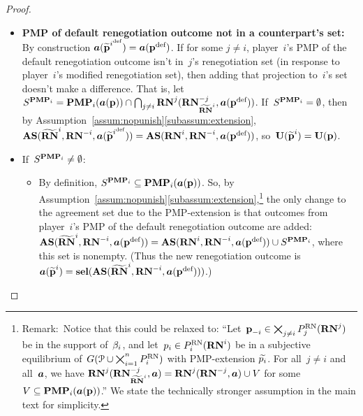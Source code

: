 \documentclass[sigconf]{aamas}
\newcommand{\selection}{sel}%
\newcommand{\renegb}{\mathbf{\selection}}
\theoremstyle{definition}
\begin{document}
\begin{proof}
\begin{itemize}
        \item \textbf{PMP of default renegotiation outcome
        not in a counterpart's set:}
         By construction
    $\boldsymbol{a}({\widetilde{\textbf{p}}^{i^{\textnormal{def}}}}) = \boldsymbol{a}({\textbf{p}}^{\textnormal{def}})$.
        If for some $j \neq i$, player~$i$'s PMP
    of the
    default
    renegotiation outcome
    isn't in~$j$'s
    renegotiation set
    (in response to
    player~$i$'s modified renegotiation set),
    then 
    adding that projection
    to~$i$'s
    set doesn't make a difference.
    That is,
    let
    ${S}^{\mathbf{PMP}_i} = \mathbf{PMP}_i(\boldsymbol{a}(\textbf{p})) \cap \bigcap_{j \neq i} \mathbf{RN}^{j}(\mathbf{RN}^{-j}_{{\widetilde{\mathbf{RN}}}^{i}}, \boldsymbol{a}({\textbf{p}}^{\textnormal{def}}))$.
    If~${S}^{\mathbf{PMP}_i} = \emptyset$,
    then by Assumption~\ref{assum:nopunish}\ref{subassum:extension}, $\textbf{AS}({\widetilde{\mathbf{RN}}}^{i}, \mathbf{RN}^{-i}, \boldsymbol{a}({\widetilde{\textbf{p}}^{i^{\textnormal{def}}}})) = \textbf{AS}(\mathbf{RN}^{i}, \mathbf{RN}^{-i}, \boldsymbol{a}({\textbf{p}}^{\textnormal{def}}))$,
    so~$\textbf{U}({\widetilde{\textbf{p}}^i}) = \textbf{U}(\textbf{p})$.
        \item 
        If~${S}^{\mathbf{PMP}_i} \neq \emptyset$:
            \begin{itemize}
            \item
            By definition, ${S}^{\mathbf{PMP}_i} \subseteq \mathbf{PMP}_i(\boldsymbol{a}(\textbf{p}))$.
            So, by Assumption~\ref{assum:nopunish}\ref{subassum:extension},\footnote{Remark:\ Notice that this could be relaxed to: ``Let~$\textbf{p}_{-i} \in \bigtimes_{j \neq i} P_j^{\textnormal{RN}}(\mathbf{RN}^{j})$ be in the
     support of~$\beta_i$,
     and let~$p_i \in P_i^{\textnormal{RN}}(\mathbf{RN}^{i})$
     be in a subjective equilibrium
     of~$G(\mathcal{P} \cup \bigtimes_{i=1}^{{n}} P_i^{\textnormal{RN}})$
     with PMP-extension $\widetilde{p_i}$.
         For all~$j \neq i$ and all~$\boldsymbol{a}$, we have
     $\mathbf{RN}^{j}(\mathbf{RN}^{-j}_{{\widetilde{\mathbf{RN}}}^{i}},\boldsymbol{a}) = \mathbf{RN}^{j}(\mathbf{RN}^{-j},\boldsymbol{a}) \cup 
     {V}$ for some ${V} \subseteq \mathbf{PMP}_i(\boldsymbol{a}(\textbf{p}))$.'' We state the technically stronger assumption in the main text for simplicity.}
            the only change to the agreement
            set due to the PMP-extension
            is that outcomes from
            player~$i$'s PMP of the default
            renegotiation outcome
            are added:\
            $\textbf{AS}({\widetilde{\mathbf{RN}}}^{i}, \mathbf{RN}^{-i}, \boldsymbol{a}({\textbf{p}}^{\textnormal{def}})) = \textbf{AS}(\mathbf{RN}^{i}, \mathbf{RN}^{-i}, \boldsymbol{a}({\textbf{p}}^{\textnormal{def}})) \cup {S}^{\mathbf{PMP}_i}$,
            where this set is nonempty.
            (Thus the new renegotiation outcome
            is~$\fullact(\newfullprogi) = \renegb(\intsect(\newrenegi, \renegmi, \fullact(\deffullprog))) $.)


\end{itemize}
\end{itemize}
\end{proof}
\end{document}
